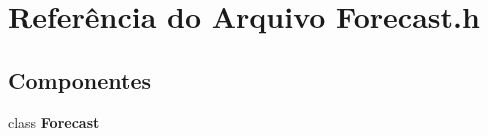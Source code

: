 \section{Referência do Arquivo Forecast.\+h}
\label{_forecast_8h}
\subsection*{Componentes}
\begin{DoxyCompactItemize}
\item 
class {\bf Forecast}
\end{DoxyCompactItemize}
